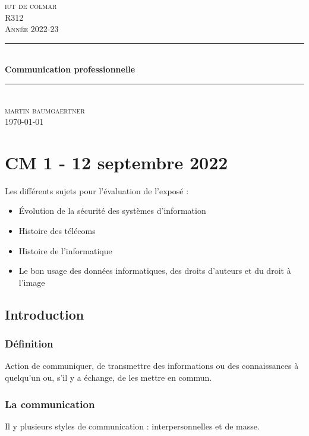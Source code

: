 \documentclass[12pt, a4paper]{article}
\begin{document}
\begin{titlepage}
	\newcommand{\HRule}{\rule{\linewidth}{0.5mm}} 
	\center 
	\textsc{\LARGE iut de colmar}\\[6.5cm] 
	\textsc{\Large R312}\\[0.5cm] 
	\textsc{\large Année 2022-23}\\[0.5cm]
	\HRule\\[0.75cm]
	{\huge\bfseries Communication professionnelle}\\[0.4cm]
	\HRule\\[1.5cm]
	\textsc{\large martin baumgaertner}\\[6.5cm] 

	\vfill\vfill\vfill
	{\large\today} 
	\vfill
\end{titlepage}
\newpage
\tableofcontents
\newpage
\section{CM 1 - 12 septembre 2022}

Les différents sujets pour l'évaluation de l'exposé :\\
\begin{itemize}
    \item Évolution de la sécurité des systèmes d'information
    \item Histoire des télécoms
    \item Histoire de l'informatique 
    \item Le bon usage des données informatiques, des droits d'auteurs et du 
    droit à l'image 
\end{itemize}

\subsection{Introduction}
\subsubsection{Définition}
Action de communiquer, de transmettre des informations ou des connaissances
à quelqu'un ou, s'il y a échange, de les mettre en commun.\\

\subsubsection{La communication}
Il y plusieurs styles de communication : interpersonnelles et de masse. 

\newpage
\end{document}
